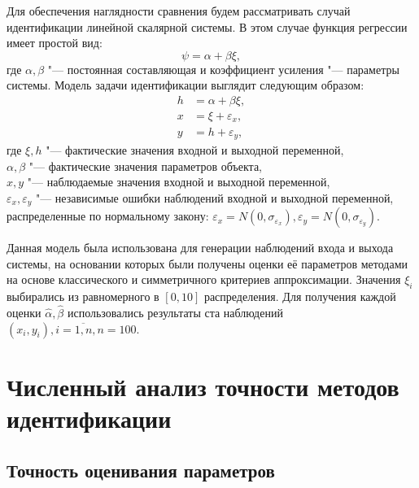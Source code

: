 Для обеспечения наглядности сравнения будем рассматривать случай
идентификации линейной скалярной системы.
В этом случае функция регрессии имеет простой вид:
\begin{equation}
  \psi = \alpha + \beta \xi,
  \label{eq:linear_fun_scalar}
\end{equation}
где \( \alpha, \beta \) "--- постоянная составляющая и коэффициент усиления "---
параметры системы. Модель задачи идентификации выглядит следующим образом:
\begin{equation}
  \label{eq:linear_model_scalar}
  \begin{aligned}
  h &= \alpha + \beta \xi, \\
  x &= \xi + \varepsilon_x, \\
  y &= h + \varepsilon_y,
  \end{aligned}
\end{equation}
где \( \xi, h \) "--- фактические значения входной и выходной переменной, \\
\hspace*{6mm} \( \alpha, \beta \) "--- фактические значения параметров объекта, \\
\hspace*{6mm} \( x, y \) "--- наблюдаемые значения входной и выходной переменной, \\
\hspace*{5mm} \( \varepsilon_x, \varepsilon_y \) "--- независимые ошибки наблюдений
входной и выходной переменной, распределенные по нормальному закону:
\(
\varepsilon_x = N(0, \sigma_{\varepsilon_x}),
\varepsilon_y = N(0, \sigma_{\varepsilon_y})
\).

Данная модель была использована для генерации наблюдений входа и выхода системы,
на основании которых были получены оценки её параметров методами на основе
классического и симметричного критериев аппроксимации.
Значения \( \xi_i \) выбирались из равномерного в \( [0, 10] \) распределения.
Для получения каждой оценки \( \hat{\alpha}, \hat{\beta} \) использовались результаты
ста наблюдений \( ( x_i, y_i ), i = \overline{1, n}, n = 100 \).

\vspace{2\baselineskip}
\section{Численный анализ точности методов идентификации}

\subsection{Точность оценивания параметров}

